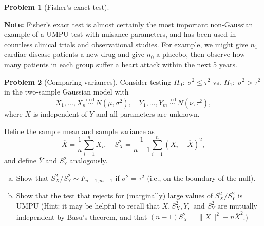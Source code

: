 \documentclass{article}
\newcommand{\simiid}{\overset{\text{i.i.d.}}{\sim}}
\theoremstyle{definition}
\newtheorem{problem}{Problem}
\begin{document}
\begin{problem}[Fisher's exact test]
\begin{enumerate}[(a)]
\end{enumerate}

{\bf Note:} Fisher's exact test is almost certainly the most important non-Gaussian example of a UMPU test with nuisance parameters, and has been used in countless clinical trials and observational studies. For example, we might give $n_1$ cardiac disease patients a new drug and give $n_0$ a placebo, then observe how many patients in each group suffer a heart attack within the next 5 years.
\end{problem}

\begin{problem}[Comparing variances]
\label{prob:comparing-variances}
Consider testing $H_0:\; \sigma^2 \leq \tau^2$ vs. $H_1:\; \sigma^2 > \tau^2$ in the two-sample Gaussian model with
\[
  X_1,\ldots,X_n \simiid N(\mu,\sigma^2), \quad Y_1,\ldots,Y_m\simiid N(\nu,\tau^2),
\]
where $X$ is independent of $Y$ and all parameters are unknown.

Define the sample mean and sample variance as
\[
\overline X = \frac{1}{n}\sum_{i=1}^n X_i,  \quad S_X^2 = \frac{1}{n-1}\sum_{i=1}^n (X_i-\overline X)^2,
\]
and define $\overline Y$ and $S_Y^2$ analogously.

\begin{enumerate}[(a)]
\item Show that $S_X^2/S_Y^2 \sim F_{n-1,m-1}$ if $\sigma^2=\tau^2$ (i.e., on the boundary of the null).



\item Show that the test that rejects for (marginally) large values of $S_X^2/S_Y^2$ is UMPU (Hint: it may be helpful to recall that $\overline X, S_X^2, \overline Y,$ and $S_Y^2$ are mutually independent by Basu's theorem, and that ${(n-1)S_X^2 = \|X\|^2 - n\overline X^2}$.)



\end{enumerate}
\end{problem}
\end{document}
